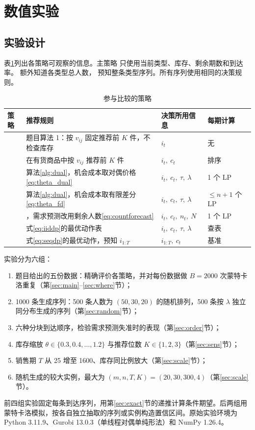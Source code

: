 \section{数值实验}\label{sec:exp}

\subsection{实验设计}\label{sec:design}
表\ref{tab:policies}列出各策略可观察的信息。主策略 \LPDual{} 只使用当前类型、库存、剩余期数和到达率。\LPCount{} 额外知道各类型总人数，\SeqDP{} 预知整条类型序列。所有序列使用相同的决策规则。

\begin{table}[htbp]
\centering\small
\caption{参与比较的策略}\label{tab:policies}
\begin{tabularx}{\linewidth}{@{}l X l l@{}}
\toprule
策略 & 推荐规则 & 决策所用信息 & 每期计算\\
\midrule
\AlgOne{} & 题目算法 1：按 $v_{ij}$ 固定推荐前 $K$ 件，不检查库存 & $i_t$ & 无\\
\Greedy{} & 在有货商品中按 $v_{ij}$ 推荐前 $K$ 件 & $i_t,\ c_t$ & 排序\\
\LPDual{} & 算法\ref{alg:dual}，机会成本取对偶价格\eqref{eq:theta_dual} & $i_t,\ c_t,\ \tau,\ \lambda$ & 1 个 LP\\
\LPFD{} & 算法\ref{alg:dual}，机会成本取有限差分\eqref{eq:theta_fd} & $i_t,\ c_t,\ \tau,\ \lambda$ & $\le n+1$ 个 LP\\
\LPCount{} & \LPDual{}，需求预测改用剩余人数\eqref{eq:countforecast} & $i_t,\ c_t,\ n_t,\ N$ & 1 个 LP\\
\IIDDP{} & 式\eqref{eq:iiddp}的最优动作表 & $i_t,\ c_t,\ \tau,\ \lambda$ & 查表\\
\SeqDP{} & 式\eqref{eq:seqdp}的最优动作，预知 $i_{1:T}$ & $i_{1:T},\ c_t$ & 基准\\
\bottomrule
\end{tabularx}
\end{table}

实验分为六组：
\begin{enumerate}[label=(\arabic*)]
\item 题目给出的五份数据：精确评价各策略，并对每份数据做 $B=2000$ 次蒙特卡洛重复（第\ref{sec:main}--\ref{sec:where}节）；
\item 1000 条生成序列：500 条人数为 $(50,30,20)$ 的随机排列，500 条按 $\lambda$ 独立同分布生成的序列（第\ref{sec:random}节）；
\item 六种分块到达顺序，检验需求预测失准时的表现（第\ref{sec:order}节）；
\item 库存缩放 $\theta\in\{0.3,0.4,\ldots,1.2\}$ 与推荐位数 $K\in\{1,2,3\}$（第\ref{sec:sens}节）；
\item 销售期 $T$ 从 25 增至 1600、库存同比例放大（第\ref{sec:scale}节）；
\item 随机生成的较大实例，最大为 $(m,n,T,K)=(20,30,300,4)$（第\ref{sec:scale}节）。
\end{enumerate}
前四组实验固定每条到达序列，用第\ref{sec:exact}节的递推计算条件期望。后两组用蒙特卡洛模拟，按各自独立抽取的序列或实例构造置信区间。原始实验环境为 Python 3.11.9、Gurobi 13.0.3（单线程对偶单纯形法）和 NumPy 1.26.4。

